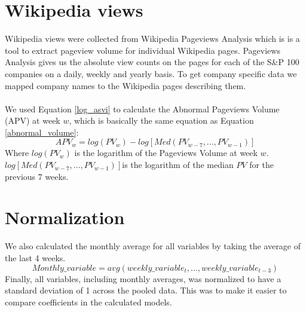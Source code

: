 \section{Wikipedia views}

Wikipedia views were collected from Wikipedia Pageviews Analysis which is is a tool to extract pageview volume for individual Wikipedia pages. Pageviews Analysis gives us the absolute view counts on the pages for each of the S\&P 100 companies on a daily, weekly and yearly basis. To get company specific data we mapped company names to the Wikipedia pages describing them.
\\\\
We used Equation \eqref{log_asvi} to calculate the Abnormal Pageviews Volume (APV) at week $w$, which is basically the same equation as Equation \eqref{abnormal_volume}:
\begin{equation}
   \label{abnormal_pageviews_volume} 
   APV_{w} = log(PV_{w}) - log[Med(PV_{w-7},...,PV_{w-1})] 
\end{equation}
   Where $log(PV_{w})$ is the logarithm of the Pageviews Volume at week $w$. $log[Med(PV_{w-7},...,PV_{w-1})]$is the logarithm of the median $PV$ for the previous 7 weeks.

\section{Normalization}
 We also calculated the monthly average for all variables by taking the average of the last 4 weeks.
\begin{equation}
   \label{monthly_var} 
   Monthly\_variable = avg(weekly\_variable_{t},...,weekly\_variable_{t-3}) 
\end{equation}
Finally, all variables, including monthly averages, was normalized to have a standard deviation of 1 across the pooled data. This was to make it easier to compare coefficients in the calculated models. 

